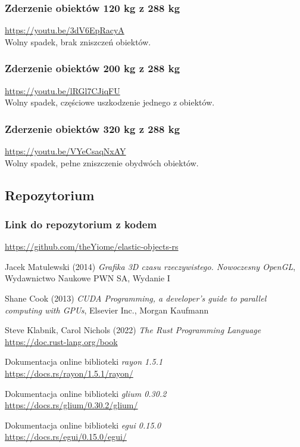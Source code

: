 \documentclass[12pt, letterpaper]{report}
\begin{document}
    \subsubsection{Zderzenie obiektów 120 kg z 288 kg}
    \url{https://youtu.be/3dV6EpRacyA} \\

    Wolny spadek, brak zniszczeń obiektów.

    \subsubsection{Zderzenie obiektów 200 kg z 288 kg}
    \url{https://youtu.be/lRGl7CJiqFU} \\

    Wolny spadek, częściowe uszkodzenie jednego z obiektów.

    \subsubsection{Zderzenie obiektów 320 kg z 288 kg}
    \url{https://youtu.be/VYeCsaqNxAY} \\

    Wolny spadek, pełne zniszczenie obydwóch obiektów.

    \subsection{Repozytorium}
    \subsubsection{Link do repozytorium z kodem}
    \url{https://github.com/theYiome/elastic-objects-rs}

    \begin{thebibliography}{9}
        Jacek Matulewski (2014) 
        \emph{Grafika 3D czasu rzeczywistego. Nowoczesny OpenGL}, 
        Wydawnictwo Naukowe PWN SA, Wydanie I

        Shane Cook (2013) 
        \emph{CUDA Programming, a developer's guide to parallel computing with GPUs}, 
        Elsevier Inc., Morgan Kaufmann

        Steve Klabnik, Carol Nichols (2022)
        \emph{The Rust Programming Language} \\
        \url{https://doc.rust-lang.org/book}

        Dokumentacja online biblioteki \emph{rayon 1.5.1} \\
        \url{https://docs.rs/rayon/1.5.1/rayon/}

        Dokumentacja online biblioteki \emph{glium 0.30.2} \\
        \url{https://docs.rs/glium/0.30.2/glium/}

        Dokumentacja online biblioteki \emph{egui 0.15.0} \\
        \url{https://docs.rs/egui/0.15.0/egui/}

    \end{thebibliography}
\end{document}
